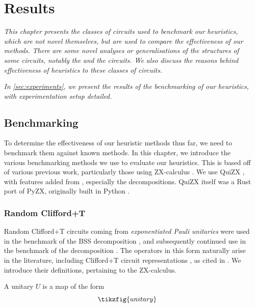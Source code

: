 \chapter{\label{ch:4-results}Results}

\minitoc

\textit{
    This chapter presents the classes of circuits used to benchmark our heuristics,
    which are not novel themselves, but are used to compare the effectiveness of our methods.
    There are some novel analyses or generalisations of the structures of some circuits,
    notably the  and the  circuits.
    We also discuss the reasons behind effectiveness of heuristics to these classes of circuits.
}

\textit{
    In \autoref{sec:experiments}, we present the results of the benchmarking of our heuristics,
    with experimentation setup detailed.
}

\section{Benchmarking}
To determine the effectiveness of our heuristic methods thus far,
we need to benchmark them against known methods.
In this chapter, we introduce the various benchmarking methods we use to evaluate our heuristics.
This is based off of various previous work, particularly those using ZX-calculus 
\cite{Kissinger2022cat,Kissinger_2022,sutcliffe2024proccut,Codsi2022}.
We use QuiZX \cite{quizx}, with features added from \cite{Kissinger2022cat},
especially the  decompositions.
QuiZX itself was a Rust port of PyZX, originally built in Python \cite{kissinger2020Pyzx}.

\subsection{Random Clifford+T}
Random Clifford+T circuits coming from \textit{exponentiated Pauli unitaries} 
were used in the benchmark of the BSS decomposition \cite{Kissinger2020}, 
and subsequently continued use in the benchmark of the  decomposition \cite{Kissinger2022cat}.
The operators in this form naturally arise in the literature, 
including Clifford+T circuit representations \cite{gosset2014}, as cited in \cite{Kissinger2020}.
We introduce their definitions, pertaining to the ZX-calculus.

\begin{definition}[Unitary]
    A unitary $U$ is a map of the form
\begin{equation}
    \tikzfig{unitary}
\end{equation} 
\end{definition}

